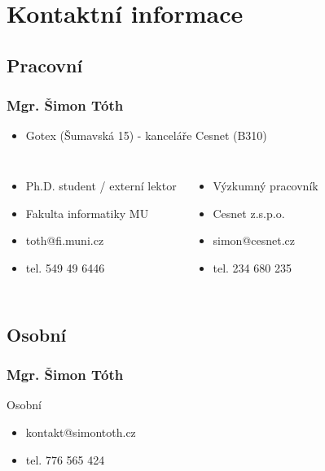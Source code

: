 \section{Kontaktní informace}
	\subsection{Pracovní}

\begin{frame}[label=kontakt-simontoth]
	\frametitle{Mgr. Šimon Tóth}
	\begin{itemize}
		\item{Gotex (Šumavská 15) - kanceláře Cesnet (B310)}
	\end{itemize}
	
	\begin{center}
	\begin{columns}

		\begin{itemize}
			\item{Ph.D. student / externí lektor}
			\item{Fakulta informatiky MU}
			\item{toth@fi.muni.cz}
			\item{tel. 549 49 6446}
		\end{itemize}

		\begin{itemize}
			\item{Výzkumný pracovník}
			\item{Cesnet z.s.p.o.}
			\item{simon@cesnet.cz}
			\item{tel. 234 680 235}
		\end{itemize}

	\end{columns}
	\end{center}

\end{frame}

	\subsection{Osobní}

\begin{frame}
	\frametitle{Mgr. Šimon Tóth}
		Osobní
		\begin{itemize}
			\item{kontakt@simontoth.cz}
			\item{tel. 776 565 424}
		\end{itemize}
\end{frame}


